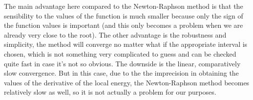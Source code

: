 		The main advantage here compared to the Newton-Raphson method is that the sensibility to the values of the function is much smaller because only the sign of the function values is important (and this only becomes a problem when we are already very close to the root). The other advantage is the robustness and simplicity, the method will converge no matter what if the appropriate interval is chosen, which is not something very complicated to guess and can be checked quite fast in case it's not so obvious. The downside is the linear, comparatively slow convergence. But in this case, due to the the imprecision in obtaining the values of the derivative of the local energy, the Newton-Raphson method becomes relatively slow as well, so it is not actually a problem for our purposes.

		
